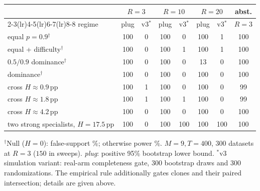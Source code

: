 \renewcommand{\arraystretch}{0.95}
\setlength{\tabcolsep}{4pt}
\footnotesize
\begin{tabular}{@{}lccccccc@{}}
\toprule
 & \multicolumn{2}{c}{$R{=}3$} & \multicolumn{2}{c}{$R{=}10$} & \multicolumn{2}{c}{$R{=}20$} & abst. \\
\cmidrule(lr){2-3}\cmidrule(lr){4-5}\cmidrule(lr){6-7}\cmidrule(lr){8-8}
regime & plug & v3$^\ast$ & plug & v3$^\ast$ & plug & v3$^\ast$ & $R{=}3$ \\
\midrule
equal $p{=}0.9$$^\dagger$ & 100 & 0 & 100 & 0 & 100 & 1 & 100 \\
equal + difficulty$^\dagger$ & 100 & 0 & 100 & 1 & 100 & 1 & 100 \\
$0.5/0.9$ dominance$^\dagger$ & 100 & 0 & 100 & 0 & 13 & 0 & 100 \\
dominance$^\dagger$ & 100 & 0 & 100 & 0 & 100 & 0 & 100 \\
cross $H{\approx}0.9$\,pp & 100 & 1 & 100 & 0 & 100 & 0 & 99 \\
cross $H{\approx}1.8$\,pp & 100 & 1 & 100 & 1 & 100 & 0 & 99 \\
cross $H{\approx}4.2$\,pp & 100 & 0 & 100 & 0 & 100 & 0 & 100 \\
two strong specialists, $H{=}17.5$\,pp & 100 & 0 & 100 & 100 & 100 & 100 & 100 \\
\bottomrule
\end{tabular}

{\scriptsize $^\dagger$Null ($H{=}0$): false-support \%; otherwise power \%. $M{=}9,T{=}400$, $300$ datasets at $R{=}3$ ($150$ in sweeps). \emph{plug}: positive 95\% bootstrap lower bound. $^\ast$v3 simulation variant: real-arm completeness gate, $300$ bootstrap draws and $300$ randomizations. The empirical rule additionally gates clones and their paired intersection; details are given above.}
